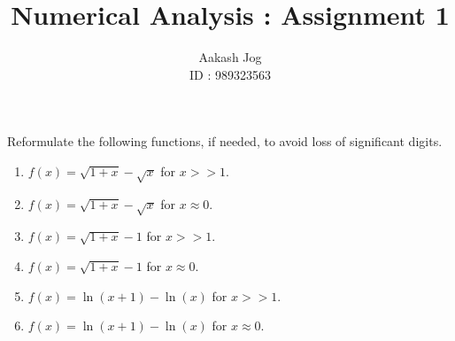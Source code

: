 \documentclass[fleqn, a4paper, 11pt, oneside]{amsart}
\title{Numerical Analysis : Assignment 1}
\author
{
	Aakash Jog\\
	ID : 989323563
}
\date{\formatdate{20}{10}{2015}}
\theoremstyle{definition}
\theoremstyle{theorem}
\begin{document}

\maketitle

%

\setcounter{question}{1}

\begin{question}
	Reformulate the following functions, if needed, to avoid loss of significant digits.
	\begin{enumerate}
		\item $f(x) = \sqrt{1 + x} - \sqrt{x}$ for $x >> 1$.
		\item $f(x) = \sqrt{1 + x} - \sqrt{x}$ for $x \approx 0$.
		\item $f(x) = \sqrt{1 + x} - 1$ for $x >> 1$.
		\item $f(x) = \sqrt{1 + x} - 1$ for $x \approx 0$.
		\item $f(x) = \ln(x + 1) - \ln(x)$ for $x >> 1$.
		\item $f(x) = \ln(x + 1) - \ln(x)$ for $x \approx 0$.
	\end{enumerate}
\end{question}
\end{document}
